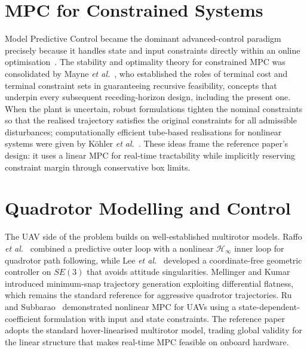 \documentclass[12pt,a4paper]{report}
\begin{document}
\section{MPC for Constrained Systems}
Model Predictive Control became the dominant advanced-control paradigm precisely because it handles state and input constraints directly within an online optimisation~\cite{garcia1989}. The stability and optimality theory for constrained MPC was consolidated by Mayne \emph{et al.}~\cite{mayne2000}, who established the roles of terminal cost and terminal constraint sets in guaranteeing recursive feasibility, concepts that underpin every subsequent receding-horizon design, including the present one. When the plant is uncertain, robust formulations tighten the nominal constraints so that the realised trajectory satisfies the original constraints for all admissible disturbances; computationally efficient tube-based realisations for nonlinear systems were given by K\"ohler \emph{et al.}~\cite{kohler2021}. These ideas frame the reference paper's design: it uses a linear MPC for real-time tractability while implicitly reserving constraint margin through conservative box limits.

\section{Quadrotor Modelling and Control}
The UAV side of the problem builds on well-established multirotor models. Raffo \emph{et al.}~\cite{raffo2010} combined a predictive outer loop with a nonlinear $\mathcal{H}_\infty$ inner loop for quadrotor path following, while Lee \emph{et al.}~\cite{lee2010} developed a coordinate-free geometric controller on $SE(3)$ that avoids attitude singularities. Mellinger and Kumar~\cite{mellinger2011} introduced minimum-snap trajectory generation exploiting differential flatness, which remains the standard reference for aggressive quadrotor trajectories. Ru and Subbarao~\cite{ru2017} demonstrated nonlinear MPC for UAVs using a state-dependent-coefficient formulation with input and state constraints. The reference paper adopts the standard hover-linearised multirotor model, trading global validity for the linear structure that makes real-time MPC feasible on onboard hardware.
\end{document}
